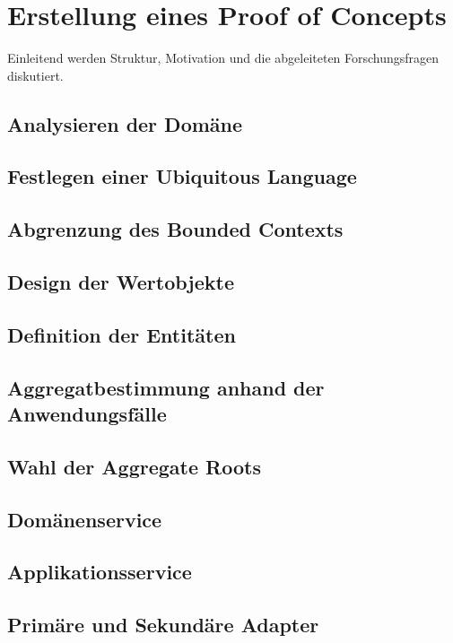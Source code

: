 

\chapter{Erstellung eines Proof of Concepts}

Einleitend werden Struktur, Motivation und die abgeleiteten Forschungsfragen diskutiert.

\section{Analysieren der Domäne}
\blindtext

\section{Festlegen einer Ubiquitous Language}
\blindtext

\section{Abgrenzung des Bounded Contexts}
\blindtext

\section{Design der Wertobjekte}
\blindtext

\section{Definition der Entitäten}
\blindtext

\section{Aggregatbestimmung anhand der Anwendungsfälle}
\blindtext

\section{Wahl der Aggregate Roots}
\blindtext

\section{Domänenservice}
\blindtext

\section{Applikationsservice}
\blindtext

\section{Primäre und Sekundäre Adapter}
\blindtext